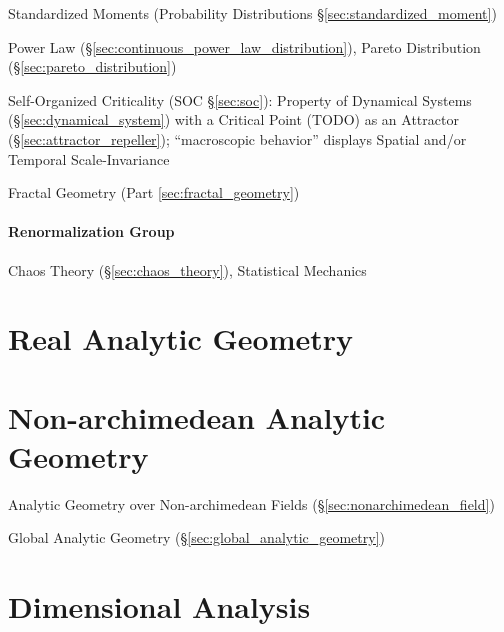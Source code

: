\fist Standardized Moments (Probability Distributions
\S\ref{sec:standardized_moment})

Power Law (\S\ref{sec:continuous_power_law_distribution}),
Pareto Distribution (\S\ref{sec:pareto_distribution})

Self-Organized Criticality (SOC \S\ref{sec:soc}): Property of Dynamical Systems
(\S\ref{sec:dynamical_system}) with a Critical Point (TODO) as an Attractor
(\S\ref{sec:attractor_repeller}); ``macroscopic behavior'' displays Spatial
and/or Temporal Scale-Invariance

\fist Fractal Geometry (Part \ref{sec:fractal_geometry})



\paragraph{Renormalization Group}\label{sec:renormalization_group}\hfill

Chaos Theory (\S\ref{sec:chaos_theory}), Statistical Mechanics



\section{Real Analytic Geometry}\label{sec:real_analytic_geometry}

\section{Non-archimedean Analytic Geometry}
\label{sec:nonarchimedean_analytic_geometry}

Analytic Geometry over Non-archimedean Fields (\S\ref{sec:nonarchimedean_field})

\fist Global Analytic Geometry (\S\ref{sec:global_analytic_geometry})



\section{Dimensional Analysis}\label{sec:dimensional_analysis}

